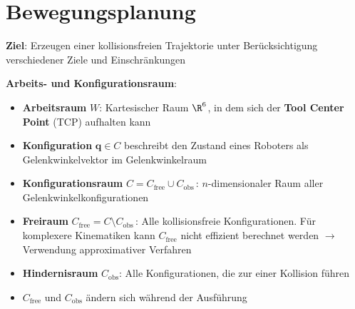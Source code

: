 \section{Bewegungsplanung}

\textbf{Ziel}: Erzeugen einer kollisionsfreien Trajektorie unter Berücksichtigung verschiedener Ziele und Einschränkungen

\textbf{Arbeits- und Konfigurationsraum}:
\begin{itemize}
	\item \textbf{Arbeitsraum} $W$: Kartesischer Raum $\R^6$, in dem sich der \textbf{Tool Center Point} (TCP) aufhalten kann
	\item \textbf{Konfiguration} $\mathbf{q}\in C$ beschreibt den Zustand eines Roboters als Gelenkwinkelvektor im Gelenkwinkelraum
	\item \textbf{Konfigurationsraum} $C=C_\text{free}\cup C_\text{obs}\,$: $n$-dimensionaler Raum aller Gelenkwinkelkonfigurationen
	\item \textbf{Freiraum} $C_\text{free}=C\setminus C_\text{obs}\,$: Alle kollisionsfreie Konfigurationen. Für komplexere Kinematiken kann $C_\text{free}$ nicht effizient berechnet werden $\rightarrow$ Verwendung approximativer Verfahren
	\item \textbf{Hindernisraum} $C_\text{obs}$: Alle Konfigurationen, die zur einer Kollision führen
	\item $C_\text{free}$ und $C_\text{obs}$ ändern sich während der Ausführung
\end{itemize}

